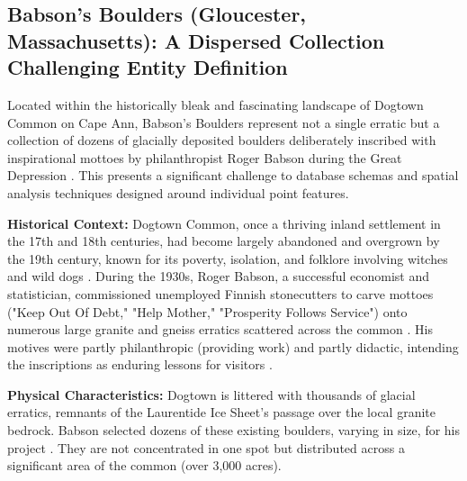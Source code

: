 \documentclass[
11pt, %
english, %
singlespacing, %
headsepline, %
]{MastersDoctoralThesis} %
\begin{document}
\subsection{Babson's Boulders (Gloucester, Massachusetts): A Dispersed Collection Challenging Entity Definition}
\label{subsec:babson}

Located within the historically bleak and fascinating landscape of Dogtown Common on Cape Ann, Babson's Boulders represent not a single erratic but a collection of dozens of glacially deposited boulders deliberately inscribed with inspirational mottoes by philanthropist Roger Babson during the Great Depression \cite{Moore2005, wburMysteriousBoulders}. This presents a significant challenge to database schemas and spatial analysis techniques designed around individual point features.

\textbf{Historical Context:} Dogtown Common, once a thriving inland settlement in the 17th and 18th centuries, had become largely abandoned and overgrown by the 19th century, known for its poverty, isolation, and folklore involving witches and wild dogs \cite{Moore2005, Babson1940}. During the 1930s, Roger Babson, a successful economist and statistician, commissioned unemployed Finnish stonecutters to carve mottoes ("Keep Out Of Debt," "Help Mother," "Prosperity Follows Service") onto numerous large granite and gneiss erratics scattered across the common \cite{wburMysteriousBoulders}. His motives were partly philanthropic (providing work) and partly didactic, intending the inscriptions as enduring lessons for visitors \cite{Moore2005}.

\textbf{Physical Characteristics:} Dogtown is littered with thousands of glacial erratics, remnants of the Laurentide Ice Sheet's passage over the local granite bedrock. Babson selected dozens of these existing boulders, varying in size, for his project \cite{wburMysteriousBoulders}. They are not concentrated in one spot but distributed across a significant area of the common (over 3,000 acres).
\end{document}
